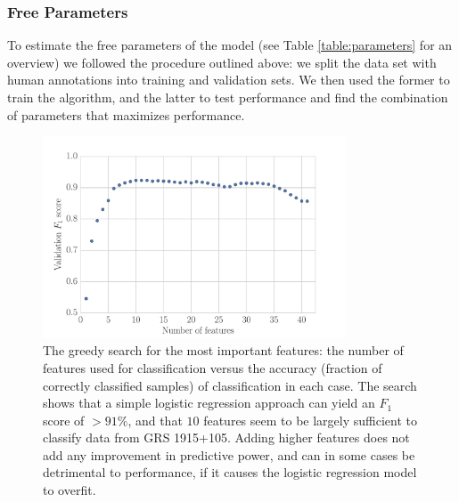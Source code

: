 \documentclass[fleqn,usenatbib]{mnras}
\begin{document}
\subsubsection{Free Parameters}
\label{sec:freeparams}

To estimate the free parameters of the model (see Table \ref{table:parameters} for an overview) we followed the procedure outlined above: we split the data set with human annotations into training and validation sets. We then used the former to train the algorithm, and the latter to test performance and find the combination of parameters that maximizes performance.

\begin{figure}
\begin{center}
\includegraphics[width=9cm]{grs1915_feature_accuracy}
\caption{The greedy search for the most important features: the number of features used for classification versus the accuracy (fraction of correctly classified samples) of classification in each case. The search shows that a simple logistic regression approach can yield an $F_1$ score of  $>91\%$, and that $10$ features seem to be largely sufficient to classify data from GRS 1915+105. Adding higher features does not add any improvement in predictive power, and can in some cases be detrimental to performance, if it causes the logistic regression model to overfit.}
\label{fig:scores}
\end{center}
\end{figure}
\end{document}

